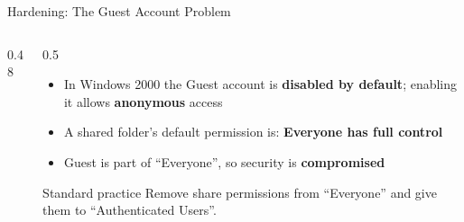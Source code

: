\documentclass[aspectratio=169,11pt,xcolor={table}]{beamer}
\begin{document}
\begin{frame}{Hardening: The Guest Account Problem}
  \begin{columns}[c]
    \begin{column}{0.48\textwidth}
      \centering
    \end{column}
    \begin{column}{0.5\textwidth}
      \begin{itemize}\small\setlength{\itemsep}{4pt}
        \item In Windows 2000 the Guest account is \textbf{disabled by default}; enabling it allows \textbf{anonymous} access
        \item A shared folder's default permission is: \textbf{Everyone has full control}
        \item Guest is part of ``Everyone'', so security is \textbf{compromised}
      \end{itemize}
      \begin{exampleblock}{Standard practice}
        \small Remove share permissions from ``Everyone'' and give them to ``Authenticated Users''.
      \end{exampleblock}
    \end{column}
  \end{columns}
\end{frame}
\end{document}
